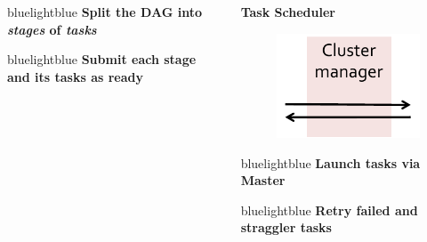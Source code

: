 {\begin{columns}[t, onlytextwidth]
\begin{column}[T]{.2\textwidth}
		\vspace{10pt}

		\begin{colorblock}{blue}{lightblue}{ }
			{\tiny \bf Split the DAG into \emph{stages} of \emph{tasks}}
		\end{colorblock}

		\vspace{10pt}

		\begin{colorblock}{blue}{lightblue}{ }
			{\tiny \bf Submit each stage and its tasks as ready}
		\end{colorblock}			
	\end{column}

	\begin{column}[T]{.2\textwidth}
		\begin{center}
			{ \tiny \bf Task Scheduler}
		\end{center}			

		\vspace{-20pt}

		\begin{figure}[h]
			\includegraphics[scale=0.5]{./Figures/Task_scheduler}
		\end{figure}

		\vspace{10pt}

		\begin{colorblock}{blue}{lightblue}{ }
			{\tiny \bf Launch tasks via Master}
		\end{colorblock}

		\vspace{10pt}

		\begin{colorblock}{blue}{lightblue}{ }
			{\tiny \bf Retry failed and straggler tasks}
		\end{colorblock}			
	\end{column}


\end{columns}}
